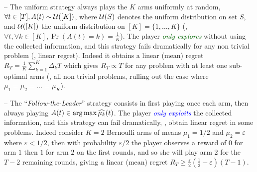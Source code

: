 -- The uniform strategy always plays the $K$ arms uniformly at random,
$\forall t\in[T], A(t) \sim \mathcal{U}([K])$, where $\mathcal{U}(S)$ denotes the uniform distribution on set $S$, and $\mathcal{U}([K])$ the uniform distribution on $[K] = \{1,\dots,K\}$ (\ie, $\forall t, \forall k\in[K], \Pr(A(t) = k) = \frac{1}{K}$).
%
The player \textcolor{darkgreen}{\emph{only explores}} without using the collected information, and this strategy fails dramatically for any non trivial problem (\ie, linear regret).
Indeed it obtains a linear (mean) regret $R_T = \frac{1}{K} \sum_{k=1}^K \Delta_k T$
which gives $R_T \propto T$ for any problem with at least one sub-optimal arms (\ie, all non trivial problems, rulling out the case where $\mu_1=\mu_2=\dots=\mu_K$).

-- The ``\emph{Follow-the-Leader}'' strategy consists in first playing once each arm, then always playing $A(t)\in\operatorname*{arg\,max} \widehat{\mu_k}(t)$.
The player \textcolor{blue}{\emph{only exploits}} the collected information, and this strategy can fail dramatically, \ie, obtain linear regret in some problems.
Indeed consider $K=2$ Bernoulli arms of means $\mu_1=1/2$ and $\mu_2=\varepsilon$ where $\varepsilon < 1/2$, then with probability $\varepsilon/2$ the player observes a reward of $0$ for arm $1$ then $1$ for arm $2$ on the first rounds, and so she will play arm $2$ for the $T-2$ remaining rounds, giving a linear (mean) regret $R_T \geq \frac{\varepsilon}{2}\left(\frac{1}{2} - \varepsilon\right) (T-1)$.



